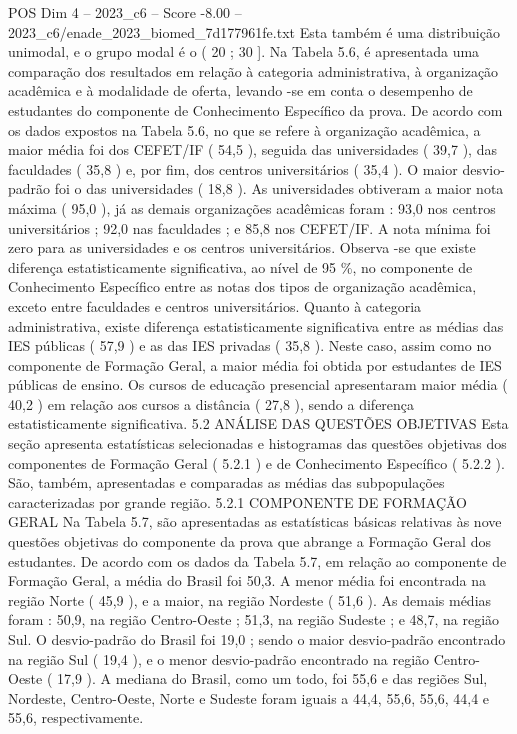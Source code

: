 \begin{textsample}{POS Dim 4 – 2023\_c6 – Score -8.00 – 2023\_c6/enade\_2023\_biomed\_7d177961fe.txt}
Esta também é uma distribuição unimodal, e o grupo modal é o ( 20 ; 30 ].
Na Tabela 5.6, é apresentada uma comparação dos resultados em relação à categoria administrativa, à organização acadêmica e à modalidade de oferta, levando -se em conta o desempenho de estudantes do componente de Conhecimento Específico da prova.
De acordo com os dados expostos na Tabela 5.6, no que se refere à organização acadêmica, a maior média foi dos CEFET/IF ( 54,5 ), seguida das universidades ( 39,7 ), das faculdades ( 35,8 ) e, por fim, dos centros universitários ( 35,4 ).
O maior desvio-padrão foi o das universidades ( 18,8 ).
As universidades obtiveram a maior nota máxima ( 95,0 ), já as demais organizações acadêmicas foram : 93,0 nos centros universitários ; 92,0 nas faculdades ; e 85,8 nos CEFET/IF.
A nota mínima foi zero para as universidades e os centros universitários.
Observa -se que existe diferença estatisticamente significativa, ao nível de 95 \%, no componente de Conhecimento Específico entre as notas dos tipos de organização acadêmica, exceto entre faculdades e centros universitários.
Quanto à categoria administrativa, existe diferença estatisticamente significativa entre as médias das IES públicas ( 57,9 ) e as das IES privadas ( 35,8 ).
Neste caso, assim como no componente de Formação Geral, a maior média foi obtida por estudantes de IES públicas de ensino.
Os cursos de educação presencial apresentaram maior média ( 40,2 ) em relação aos cursos a distância ( 27,8 ), sendo a diferença estatisticamente significativa. 5.2 ANÁLISE DAS QUESTÕES OBJETIVAS Esta seção apresenta estatísticas selecionadas e histogramas das questões objetivas dos componentes de Formação Geral ( 5.2.1 ) e de Conhecimento Específico ( 5.2.2 ).
São, também, apresentadas e comparadas as médias das subpopulações caracterizadas por grande região. 5.2.1 COMPONENTE DE FORMAÇÃO GERAL Na Tabela 5.7, são apresentadas as estatísticas básicas relativas às nove questões objetivas do componente da prova que abrange a Formação Geral dos estudantes.
De acordo com os dados da Tabela 5.7, em relação ao componente de Formação Geral, a média do Brasil foi 50,3.
A menor média foi encontrada na região Norte ( 45,9 ), e a maior, na região Nordeste ( 51,6 ).
As demais médias foram : 50,9, na região Centro-Oeste ; 51,3, na região Sudeste ; e 48,7, na região Sul.
O desvio-padrão do Brasil foi 19,0 ; sendo o maior desvio-padrão encontrado na região Sul ( 19,4 ), e o menor desvio-padrão encontrado na região Centro-Oeste ( 17,9 ).
A mediana do Brasil, como um todo, foi 55,6 e das regiões Sul, Nordeste, Centro-Oeste, Norte e Sudeste foram iguais a 44,4, 55,6, 55,6, 44,4 e 55,6, respectivamente.

\end{textsample}
